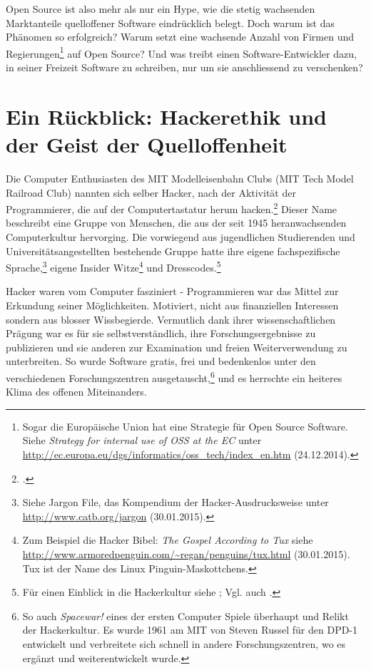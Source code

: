 \documentclass[
paper=164mm:234mm, %
pagesize, %
DIV=calc, %
10pt, %
parskip=half- %
]{scrbook}
\begin{document}
Open Source ist also mehr als nur ein Hype, wie die stetig wachsenden Marktanteile quelloffener Software eindrücklich belegt. Doch warum ist das Phänomen so erfolgreich? Warum setzt eine wachsende Anzahl von Firmen und Regierungen\footnote{Sogar die Europäische Union hat eine Strategie für Open Source Software. Siehe \emph{Strategy for internal use of OSS at the EC} unter \url{http://ec.europa.eu/dgs/informatics/oss_tech/index_en.htm} (24.12.2014).} auf Open Source? Und was treibt einen Software-Entwickler dazu, in seiner Freizeit Software zu schreiben, nur um sie anschliessend zu verschenken?


{}
\section*{Ein Rückblick: Hackerethik und der Geist der Quelloffenheit}

Die Computer Enthusiasten des MIT Modelleisenbahn Clubs (MIT Tech Model Railroad Club) nannten sich selber Hacker, nach der Aktivität der Programmierer, die auf der Computertastatur herum hacken.\footnote{\cite[10]{Levy:1984}.} Dieser Name beschreibt eine Gruppe von Menschen, die aus der seit 1945 heranwachsenden Computerkultur hervorging. Die vorwiegend aus jugendlichen Studierenden und Universitätsangestellten bestehende Gruppe hatte ihre eigene fachspezifische Sprache,\footnote{Siehe Jargon File, das Kompendium der Hacker-Ausdrucksweise unter \url{http://www.catb.org/jargon} (30.01.2015).} eigene Insider Witze\footnote{Zum Beispiel die Hacker Bibel: \emph{The Gospel According to Tux} siehe \url{http://www.armoredpenguin.com/~regan/penguins/tux.html} (30.01.2015). Tux ist der Name des Linux Pinguin-Maskottchens.} und Dresscodes.\footnote{Für einen Einblick in die Hackerkultur siehe \cite[16]{Raymond:1999}; Vgl. auch \cite{Raymond:1996}.}

Hacker waren vom Computer fasziniert - Programmieren war das Mittel zur Erkundung seiner Möglichkeiten. Motiviert, nicht aus finanziellen Interessen sondern aus blosser Wissbegierde. Vermutlich dank ihrer wissenschaftlichen Prägung war es für sie selbstverständlich, ihre Forschungsergebnisse zu publizieren und sie anderen zur Examination und freien Weiterverwendung zu unterbreiten. So wurde Software gratis, frei und bedenkenlos unter den verschiedenen Forschungszentren ausgetauscht,\footnote{So auch \emph{Spacewar!} eines der ersten Computer Spiele überhaupt und Relikt der Hackerkultur. Es wurde 1961 am MIT von Steven Russel für den DPD-1 entwickelt und verbreitete sich schnell in andere Forschungszentren, wo es ergänzt und weiterentwickelt wurde.} und es herrschte ein heiteres Klima des offenen Miteinanders.
\end{document}
